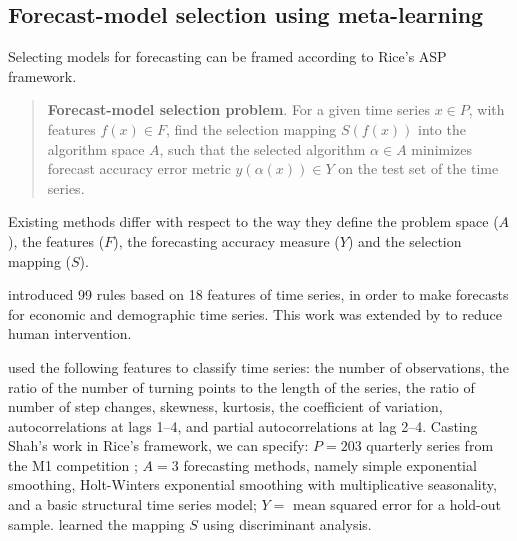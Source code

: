 \documentclass[11pt,a4paper,]{article}
\begin{document}
\hypertarget{forecast-model-selection-using-meta-learning}{%
\subsection{Forecast-model selection using meta-learning}\label{forecast-model-selection-using-meta-learning}}

Selecting models for forecasting can be framed according to Rice's ASP framework.

\begin{quote}
\textbf{Forecast-model selection problem}. For a given time series \(x \in P\), with features \(f(x) \in F\), find the selection mapping \(S(f(x))\) into the algorithm space \(A\), such that the selected algorithm \(\alpha \in A\) minimizes forecast accuracy error metric \(y(\alpha(x)) \in Y\) on the test set of the time series.
\end{quote}

Existing methods differ with respect to the way they define the problem space (\(A\)), the features (\(F\)), the forecasting accuracy measure (\(Y\)) and the selection mapping (\(S\)).

\textcite{collopy1992rule} introduced 99 rules based on 18 features of time series, in order to make forecasts for economic and demographic time series. This work was extended by \textcite{armstrong2001s} to reduce human intervention.

\textcite{shah1997model} used the following features to classify time series: the number of observations, the ratio of the number of turning points to the length of the series, the ratio of number of step changes, skewness, kurtosis, the coefficient of variation, autocorrelations at lags 1--4, and partial autocorrelations at lag 2--4. Casting Shah's work in Rice's framework, we can specify: \(P=203\) quarterly series from the M1 competition \autocite{makridakis1982accuracy}; \(A=3\) forecasting methods, namely simple exponential smoothing, Holt-Winters exponential smoothing with multiplicative seasonality, and a basic structural time series model; \(Y=\) mean squared error for a hold-out sample. \textcite{shah1997model} learned the mapping \(S\) using discriminant analysis.
\end{document}
